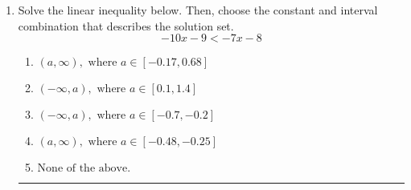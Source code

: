\documentclass[14pt]{extbook}
\newcommand{\litem}[1]{\item#1\hspace*{-1cm}\rule{\textwidth}{0.4pt}}
\begin{document}
\begin{enumerate}
{\begin{enumerate}[label=\Alph*.]
\end{enumerate} }
\litem{
Solve the linear inequality below. Then, choose the constant and interval combination that describes the solution set.\[ -10x -9 < -7x -8 \]\begin{enumerate}[label=\Alph*.]
\item \( (a, \infty), \text{ where } a \in [-0.17, 0.68] \)
\item \( (-\infty, a), \text{ where } a \in [0.1, 1.4] \)
\item \( (-\infty, a), \text{ where } a \in [-0.7, -0.2] \)
\item \( (a, \infty), \text{ where } a \in [-0.48, -0.25] \)
\item \( \text{None of the above}. \)

\end{enumerate} }
\end{enumerate}
\end{document}
